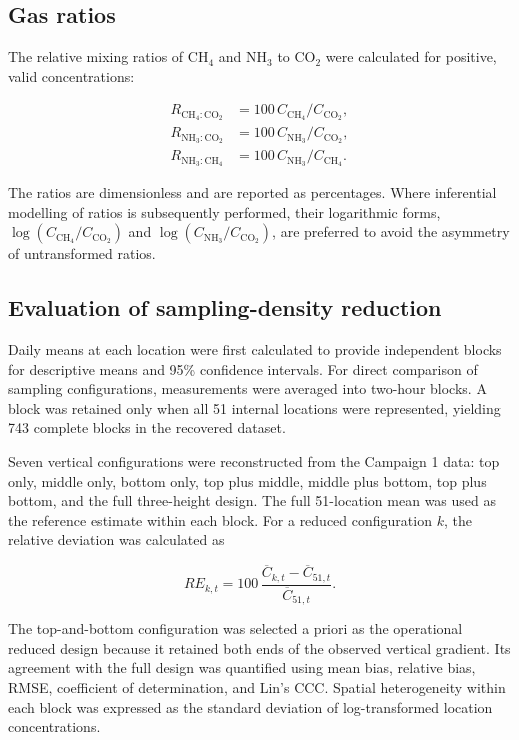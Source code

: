 \documentclass[12pt,a4paper]{article}
\begin{document}
\subsection{Gas ratios}

The relative mixing ratios of \(\mathrm{CH_4}\) and \(\mathrm{NH_3}\) to
\(\mathrm{CO_2}\) were calculated for positive, valid concentrations:

\begin{align}
R_{\mathrm{CH_4:CO_2}} &=
100\,C_{\mathrm{CH_4}}/C_{\mathrm{CO_2}},\\
R_{\mathrm{NH_3:CO_2}} &=
100\,C_{\mathrm{NH_3}}/C_{\mathrm{CO_2}},\\
R_{\mathrm{NH_3:CH_4}} &=
100\,C_{\mathrm{NH_3}}/C_{\mathrm{CH_4}}.
\end{align}

The ratios are dimensionless and are reported as percentages. Where
inferential modelling of ratios is subsequently performed, their logarithmic
forms, \(\log(C_{\mathrm{CH_4}}/C_{\mathrm{CO_2}})\) and
\(\log(C_{\mathrm{NH_3}}/C_{\mathrm{CO_2}})\), are preferred to avoid the
asymmetry of untransformed ratios.

\subsection{Evaluation of sampling-density reduction}

Daily means at each location were first calculated to provide independent
blocks for descriptive means and 95\% confidence intervals. For direct
comparison of sampling configurations, measurements were averaged into
two-hour blocks. A block was retained only when all 51 internal locations
were represented, yielding 743 complete blocks in the recovered dataset.

Seven vertical configurations were reconstructed from the Campaign 1 data:
top only, middle only, bottom only, top plus middle, middle plus bottom, top
plus bottom, and the full three-height design. The full 51-location mean was
used as the reference estimate within each block. For a reduced configuration
\(k\), the relative deviation was calculated as

\begin{equation}
RE_{k,t}=100\,
\frac{\overline{C}_{k,t}-\overline{C}_{51,t}}
     {\overline{C}_{51,t}}.
\end{equation}

The top-and-bottom configuration was selected a priori as the operational
reduced design because it retained both ends of the observed vertical
gradient. Its agreement with the full design was quantified using mean bias,
relative bias, RMSE, coefficient of determination, and Lin's CCC. Spatial
heterogeneity within each block was expressed as the standard deviation of
log-transformed location concentrations.
\end{document}
